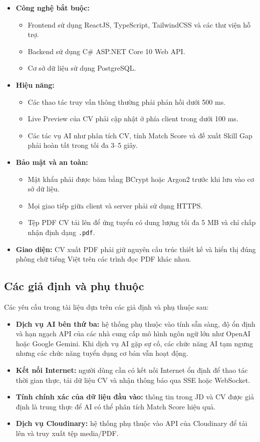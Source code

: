 \begin{itemize}
    \item \textbf{Công nghệ bắt buộc:}
    \begin{itemize}
        \item Frontend sử dụng ReactJS, TypeScript, TailwindCSS và các thư viện hỗ trợ.
        \item Backend sử dụng C\# ASP.NET Core 10 Web API.
        \item Cơ sở dữ liệu sử dụng PostgreSQL.
    \end{itemize}
    \item \textbf{Hiệu năng:}
    \begin{itemize}
        \item Các thao tác truy vấn thông thường phải phản hồi dưới 500 ms.
        \item Live Preview của CV phải cập nhật ở phía client trong dưới 100 ms.
        \item Các tác vụ AI như phân tích CV, tính Match Score và đề xuất Skill Gap phải hoàn tất trong tối đa 3--5 giây.
    \end{itemize}
    \item \textbf{Bảo mật và an toàn:}
    \begin{itemize}
        \item Mật khẩu phải được băm bằng BCrypt hoặc Argon2 trước khi lưu vào cơ sở dữ liệu.
        \item Mọi giao tiếp giữa client và server phải sử dụng HTTPS.
        \item Tệp PDF CV tải lên để ứng tuyển có dung lượng tối đa 5 MB và chỉ chấp nhận định dạng \texttt{.pdf}.
    \end{itemize}
    \item \textbf{Giao diện:} CV xuất PDF phải giữ nguyên cấu trúc thiết kế và hiển thị đúng phông chữ tiếng Việt trên các trình đọc PDF khác nhau.
\end{itemize}

\subsection{Các giả định và phụ thuộc}

\noindent Các yêu cầu trong tài liệu dựa trên các giả định và phụ thuộc sau:

\begin{itemize}
    \item \textbf{Dịch vụ AI bên thứ ba:} hệ thống phụ thuộc vào tính sẵn sàng, độ ổn định và hạn ngạch API của các nhà cung cấp mô hình ngôn ngữ lớn như OpenAI hoặc Google Gemini. Khi dịch vụ AI gặp sự cố, các chức năng AI tạm ngưng nhưng các chức năng tuyển dụng cơ bản vẫn hoạt động.
    \item \textbf{Kết nối Internet:} người dùng cần có kết nối Internet ổn định để thao tác thời gian thực, tải dữ liệu CV và nhận thông báo qua SSE hoặc WebSocket.
    \item \textbf{Tính chính xác của dữ liệu đầu vào:} thông tin trong JD và CV được giả định là trung thực để AI có thể phân tích Match Score hiệu quả.
    \item \textbf{Dịch vụ Cloudinary:} hệ thống phụ thuộc vào API của Cloudinary để tải lên và truy xuất tệp media/PDF.
\end{itemize}
